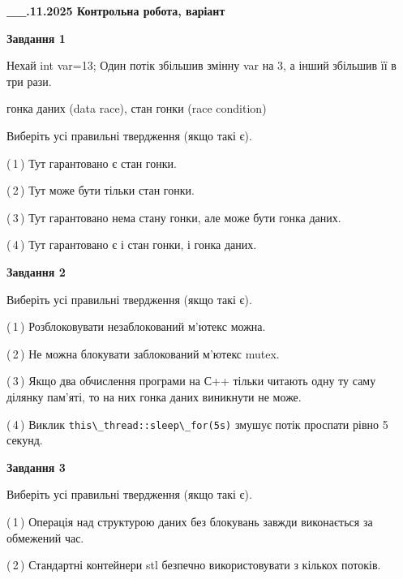 \documentclass[12pt, ukrainian]{article}
\def\code#1{\Verb!#1!}
\begin{document}
\begin {large}

\textbf{\_\_.11.2025 Контрольна робота, варіант  }\par


{

\begin{center}
\textbf{Завдання 1}
\end{center}
Нехай int var=13; Один потік збільшив змінну var на 3, а інший збільшив її в три рази.

гонка даних (data race), стан гонки (race condition)

Виберіть усі правильні твердження (якщо такі є).\par
\vspace{2mm}
(\,1\,) Тут гарантовано є стан гонки.%

(\,2\,) Тут може бути тільки стан гонки.%

(\,3\,) Тут гарантовано нема стану гонки, але може бути гонка даних.%

(\,4\,) Тут гарантовано є і стан гонки, і гонка даних.%



\begin{center}
\textbf{Завдання 2}
\end{center}
Виберіть усі правильні твердження (якщо такі є).\par
\vspace{2mm}

(\,1\,) Розблоковувати незаблокований м’ютекс можна.%

(\,2\,) Не можна блокувати заблокований м’ютекс mutex.%

(\,3\,) Якщо два обчислення програми на С++ тільки читають одну ту саму ділянку пам'яті, то на них гонка даних  виникнути не може.%

(\,4\,) Виклик \code{this\_thread::sleep\_for(5s)} змушує потік проспати рівно 5 секунд.%



\begin{center}
\textbf{Завдання 3}
\end{center}
Виберіть усі правильні твердження (якщо такі є).\par
\vspace{2mm}

(\,1\,) Операція над структурою даних без блокувань завжди виконається за обмежений час.%

(\,2\,) Стандартні контейнери stl безпечно використовувати з кількох потоків.%

}
\end{large}
\end{document}
